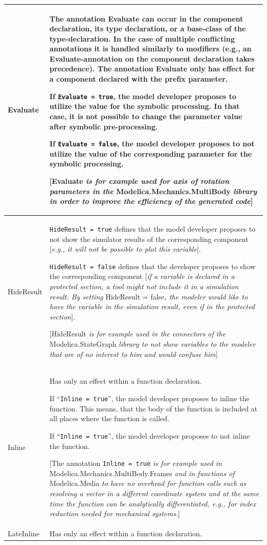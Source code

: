 \documentclass[10pt,a4paper]{report}
\begin{document}
\begin{longtable}[]{|p{4.2cm}|p{10cm}|}
\hline \endhead
Evaluate&
The annotation Evaluate can occur in the component declaration, its type
declaration, or a base-class of the type-declaration. In the case of
multiple conflicting annotations it is handled similarly to modifiers
(e.g., an Evaluate-annotation on the component declaration takes
precedence). The annotation Evaluate only has effect for a component
declared with the prefix parameter.

If \lstinline!Evaluate = true!, the model developer proposes to utilize the value
for the symbolic processing. In that case, it is not possible to change
the parameter value after symbolic pre-processing.

If \lstinline!Evaluate = false!, the model developer proposes to not utilize the
value of the corresponding parameter for the symbolic processing.

{[}Evaluate \emph{is for example used for axis of rotation parameters in
the} Modelica.Mechanics.MultiBody \emph{library in order to improve the
efficiency of the generated code}{]}\\ \hline
HideResult &
\lstinline!HideResult = true! defines that the model developer proposes to not show
the simulator results of the corresponding component {[}\emph{e.g., it
will not be possible to plot this variable}{]}.

\lstinline!HideResult = false! defines that the developer proposes to show the
corresponding component {[}\emph{if a variable is declared in a
protected section, a tool might not include it in a simulation result.
By setting} HideResult = false\emph{, the modeler would like to have the
variable in the simulation result, even if in the protected section}{]}.

{[}HideResult \emph{is for example used in the connectors of the}
Modelica.StateGraph \emph{library to not show variables to the modeler
that are of no interest to him and would confuse him}{]}\\ \hline
Inline &
Has only an effect within a function declaration.

If ``\lstinline!Inline = true!'', the model developer proposes to inline the
function. This means, that the body of the function is included at all
places where the function is called.

If ``\lstinline!Inline = true!'', the model developer proposes to not inline the
function.

{[}The annotation \lstinline!Inline = true! \emph{is for example used in}
Modelica\allowbreak{}.Mechanics\allowbreak{}.MultiBody\allowbreak{}.Frames \emph{and in functions of}
Modelica\allowbreak{}.Media \emph{to have no overhead for function calls such as
resolving a vector in a different coordinate system and at the same time
the function can be analytically differentiated, e.g., for index
reduction needed for mechanical systems.}{]}\\ \hline
LateInline
&
Has only an effect within a function declaration.


\end{longtable}
\end{document}

